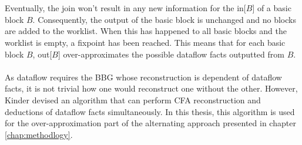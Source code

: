 \documentclass{kththesis}
\begin{document}
\\ \\
Eventually, the join won't result in any new information for the in[$B$] of a basic block $B$. Consequently, the output of the basic block is unchanged and no blocks are added to the worklist. When this has happened to all basic blocks and the worklist is empty, a fixpoint has been reached. This means that for each basic block $B$, out[$B$] over-approximates the possible dataflow facts outputted from $B$.
\\ \\
As dataflow requires the BBG whose reconstruction is dependent of dataflow facts, it is not trivial how one would reconstruct one without the other. However, Kinder\cite{Jakstab} devised an algorithm that can perform CFA reconstruction and deductions of dataflow facts simultaneously. In this thesis, this algorithm is used for the over-approximation part of the alternating approach presented in chapter \ref{chap:methodlogy}.


\end{document}
